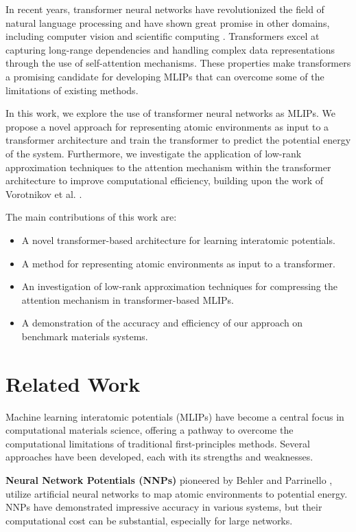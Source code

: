 \documentclass{article}
\begin{document}
In recent years, transformer neural networks have revolutionized the field of natural language processing and have shown great promise in other domains, including computer vision and scientific computing \cite{vaswani2017attention}. Transformers excel at capturing long-range dependencies and handling complex data representations through the use of self-attention mechanisms. These properties make transformers a promising candidate for developing MLIPs that can overcome some of the limitations of existing methods.

In this work, we explore the use of transformer neural networks as MLIPs. We propose a novel approach for representing atomic environments as input to a transformer architecture and train the transformer to predict the potential energy of the system. Furthermore, we investigate the application of low-rank approximation techniques to the attention mechanism within the transformer architecture to improve computational efficiency, building upon the work of Vorotnikov et al. \cite{vorotnikov2025low}.

The main contributions of this work are:
\begin{itemize}
    \item A novel transformer-based architecture for learning interatomic potentials.
    \item A method for representing atomic environments as input to a transformer.
    \item An investigation of low-rank approximation techniques for compressing the attention mechanism in transformer-based MLIPs.
    \item A demonstration of the accuracy and efficiency of our approach on benchmark materials systems.
\end{itemize}

\section{Related Work}

Machine learning interatomic potentials (MLIPs) have become a central focus in computational materials science, offering a pathway to overcome the computational limitations of traditional first-principles methods. Several approaches have been developed, each with its strengths and weaknesses.

\textbf{Neural Network Potentials (NNPs)} pioneered by Behler and Parrinello \cite{behler2007generalized}, utilize artificial neural networks to map atomic environments to potential energy. NNPs have demonstrated impressive accuracy in various systems, but their computational cost can be substantial, especially for large networks.
\end{document}

